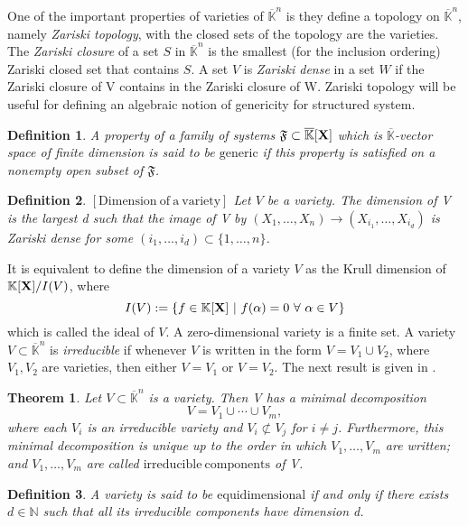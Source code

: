 \documentclass[11pt]{article}
\numberwithin{Property}{section}
\newtheorem{Theorem}{Theorem}%
\numberwithin{Theorem}{section}
\numberwithin{Proposition}{section}
\numberwithin{Lemma}{section}
\numberwithin{Corollary}{section}
\newtheorem{Definition}{Definition}%
\numberwithin{Definition}{section}
\numberwithin{Remark}{section}
\numberwithin{Conjecture}{section}
\numberwithin{Problem}{section}
\numberwithin{Claim}{section}
\theoremstyle{definition}
\numberwithin{Example}{section}
\def\bar{\overline}
\newcommand{\field}{\mathbb{K}} %
\newcommand{\mat}[1]{\mathbf{\MakeUppercase{#1}}} %
\begin{document}
One of the important properties of varieties of $\bar{\field}^n$ is they define a topology on $\bar{\field}^n$, namely \emph{Zariski topology}, with the closed sets of the topology are the varieties. The \emph{Zariski closure} of a set $S$ in $\bar{\field}^n$ is the smallest (for the inclusion ordering) Zariski closed set that contains $S$. A set $V$ is \emph{Zariski dense} in a set $W$ if the Zariski closure of V contains in the Zariski closure of W. Zariski topology will be useful for defining an algebraic notion of genericity for structured system. 
\begin{Definition} A property of a family of systems $\mathfrak{F} \subset \bar{\field}[\mat{X}]$ which is $\bar{\field}$-vector space of finite dimension is said to be $\mathrm{generic}$ if this property is satisfied on a nonempty open subset of $\mathfrak{F}$.
\end{Definition}
\begin{Definition}$\mathrm{[Dimension \ of \ a \ variety]}$ Let $V$ be a variety. The dimension of V is the largest d such that the image of V by $(X_1, \ldots, X_n) \to (X_{i_1}, \ldots, X_{i_d})$ is Zariski dense for some $(i_1, \ldots, i_d) \subset \{1, \ldots, n\}$.
\end{Definition}
It is equivalent to define the dimension of a variety $V$ as the Krull dimension of $\field[\mat{X}]/I(V)$, where \[I(V) := \{f \in \field[\mat{X}] \ | \ f(\alpha) = 0 \ \forall \ \alpha \in V\}\]
 which is called the ideal of $V$. A zero-dimensional variety is a finite set. A variety $V \subset \bar{\field}^n$ is \emph{irreducible} if whenever $V$ is written in the form $V = V_1 \cup V_2$, where $V_1, V_2$ are varieties, then either $V = V_1$ or $V = V_2$. The next result is given in \cite[Theorem~4 -- section~6 -- chapter~4]{Cox07}.
\begin{Theorem} Let $V \subset \bar{\field}^{n}$ is a variety. Then V has a minimal decomposition 
\[
V = V_1 \cup \cdots \cup V_m,
\] where each $V_i$ is an irreducible variety and $V_i \not\subset V_j$ for $i \ne j$. Furthermore, this minimal decomposition is unique up to the order in which $V_1, \ldots, V_m$ are written; and $V_1, \ldots, V_m$ are called $\mathrm{irreducible \ components}$ of V.
\end{Theorem}

\begin{Definition} A variety is said to be $\mathrm{equidimensional}$ if and only if there exists $d \in \mathbb{N}$ such that all its irreducible components have dimension d. 
\end{Definition}
\end{document}
